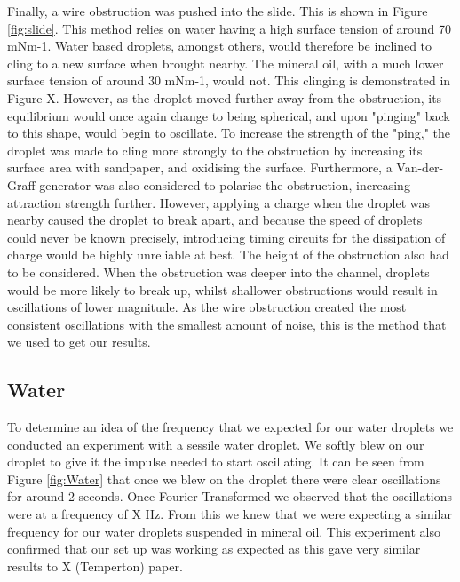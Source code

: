 \documentclass{physics_article_B}
\begin{document}
        Finally, a wire obstruction was pushed into the slide. This is shown in Figure \ref{fig:slide}. This method relies on water having a high surface tension of around 70 mNm-1. Water based droplets, amongst others, would therefore be inclined to cling to a new surface when brought nearby. The mineral oil, with a much lower surface tension of around 30 mNm-1, would not. This clinging is demonstrated in Figure X. However, as the droplet moved further away from the obstruction, its equilibrium would once again change to being spherical, and upon "pinging" back to this shape, would begin to oscillate. To increase the strength of the "ping," the droplet was made to cling more strongly to the obstruction by increasing its surface area with sandpaper, and oxidising the surface. Furthermore, a Van-der-Graff generator was also considered to polarise the obstruction, increasing attraction strength further. However, applying a charge when the droplet was nearby caused the droplet to break apart, and because the speed of droplets could never be known precisely, introducing timing circuits for the dissipation of charge would be highly unreliable at best. The height of the obstruction also had to be considered. When the obstruction was deeper into the channel, droplets would be more likely to break up, whilst shallower obstructions would result in oscillations of lower magnitude. As the wire obstruction created the most consistent oscillations with the smallest amount of noise, this is the method that we used to get our results.
 
 	\subsection{Water}
 	
        To determine an idea of the frequency that we expected for our water droplets we conducted an experiment with a sessile water droplet. We softly blew on our droplet to give it the impulse needed to start oscillating. It can be seen from Figure \ref{fig:Water} that once we blew on the droplet there were clear oscillations for around 2 seconds. Once Fourier Transformed we observed that the oscillations were at a frequency of X Hz. From this we knew that we were expecting a similar frequency for our water droplets suspended in mineral oil. This experiment also confirmed that our set up was working as expected as this gave very similar results to X (Temperton) paper. 
 
\end{document}
